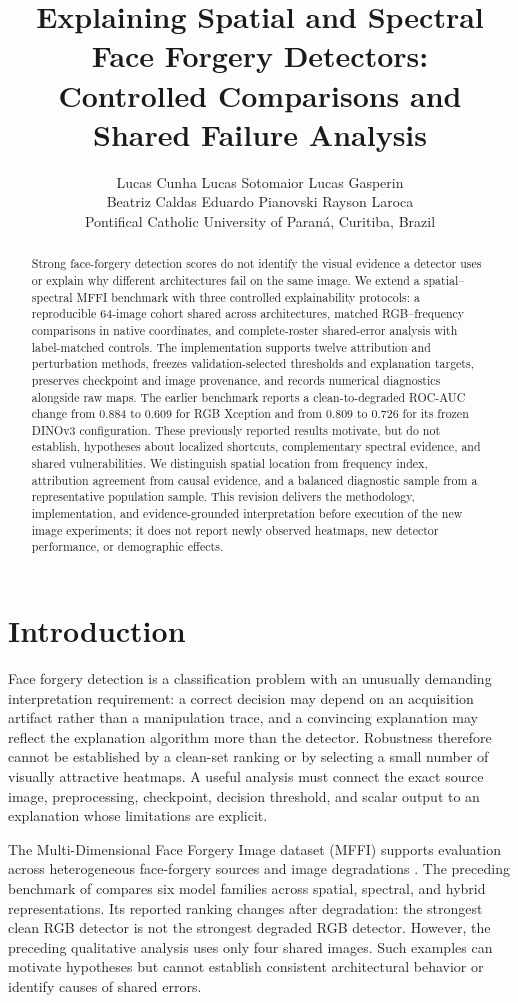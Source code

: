 \documentclass{article}
\title{Explaining Spatial and Spectral Face Forgery Detectors:\\Controlled Comparisons and Shared Failure Analysis}
\author{Lucas Cunha \quad Lucas Sotomaior \quad Lucas Gasperin\\Beatriz Caldas \quad Eduardo Pianovski \quad Rayson Laroca\\Pontifical Catholic University of Paran\'{a}, Curitiba, Brazil}
\begin{document}
\maketitle

\begin{abstract}
Strong face-forgery detection scores do not identify the visual evidence a detector uses or explain why different architectures fail on the same image. We extend a spatial--spectral MFFI benchmark with three controlled explainability protocols: a reproducible 64-image cohort shared across architectures, matched RGB--frequency comparisons in native coordinates, and complete-roster shared-error analysis with label-matched controls. The implementation supports twelve attribution and perturbation methods, freezes validation-selected thresholds and explanation targets, preserves checkpoint and image provenance, and records numerical diagnostics alongside raw maps. The earlier benchmark reports a clean-to-degraded ROC-AUC change from 0.884 to 0.609 for RGB Xception and from 0.809 to 0.726 for its frozen DINOv3 configuration. These previously reported results motivate, but do not establish, hypotheses about localized shortcuts, complementary spectral evidence, and shared vulnerabilities. We distinguish spatial location from frequency index, attribution agreement from causal evidence, and a balanced diagnostic sample from a representative population sample. This revision delivers the methodology, implementation, and evidence-grounded interpretation before execution of the new image experiments; it does not report newly observed heatmaps, new detector performance, or demographic effects.
\end{abstract}

\section{Introduction}
Face forgery detection is a classification problem with an unusually demanding interpretation requirement: a correct decision may depend on an acquisition artifact rather than a manipulation trace, and a convincing explanation may reflect the explanation algorithm more than the detector. Robustness therefore cannot be established by a clean-set ranking or by selecting a small number of visually attractive heatmaps. A useful analysis must connect the exact source image, preprocessing, checkpoint, decision threshold, and scalar output to an explanation whose limitations are explicit.

The Multi-Dimensional Face Forgery Image dataset (MFFI) supports evaluation across heterogeneous face-forgery sources and image degradations \citep{miao2025}. The preceding benchmark of \citet{cunha2026} compares six model families across spatial, spectral, and hybrid representations. Its reported ranking changes after degradation: the strongest clean RGB detector is not the strongest degraded RGB detector. However, the preceding qualitative analysis uses only four shared images. Such examples can motivate hypotheses but cannot establish consistent architectural behavior or identify causes of shared errors.
\end{document}
